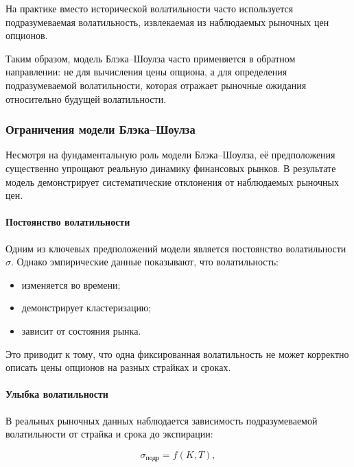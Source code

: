 \documentclass[11pt,a4paper]{article}
\begin{document}
На практике вместо исторической волатильности часто используется подразумеваемая волатильность, извлекаемая из наблюдаемых рыночных цен опционов.

Таким образом, модель Блэка--Шоулза часто применяется в обратном направлении: не для вычисления цены опциона, а для определения подразумеваемой волатильности, которая отражает рыночные ожидания относительно будущей волатильности.

\subsubsection{Ограничения модели Блэка--Шоулза}

Несмотря на фундаментальную роль модели Блэка--Шоулза, её предположения существенно упрощают реальную динамику финансовых рынков. В результате модель демонстрирует систематические отклонения от наблюдаемых рыночных цен.

\paragraph{Постоянство волатильности}

Одним из ключевых предположений модели является постоянство волатильности $\sigma$. Однако эмпирические данные показывают, что волатильность:

\begin{itemize}
    \item изменяется во времени;
    
    \item демонстрирует кластеризацию;
    
    \item зависит от состояния рынка.
\end{itemize}

Это приводит к тому, что одна фиксированная волатильность не может корректно описать цены опционов на разных страйках и сроках.

\paragraph{Улыбка волатильности}

В реальных рыночных данных наблюдается зависимость подразумеваемой волатильности от страйка и срока до экспирации:

\begin{equation}
\sigma_{\text{подр}} = f(K, T),
\end{equation}
\end{document}

